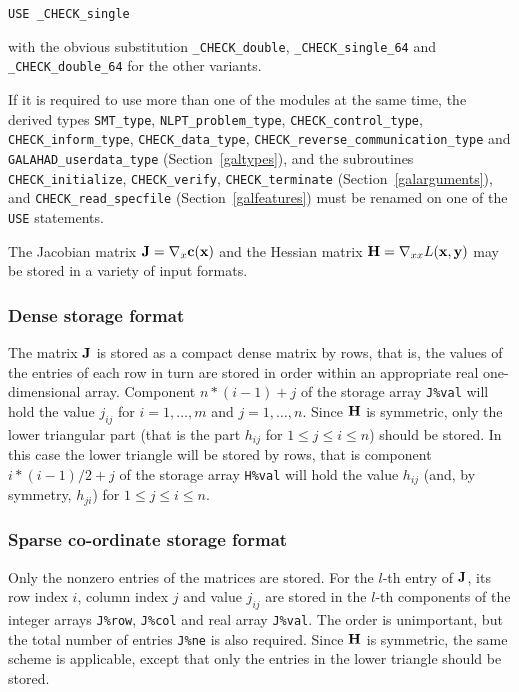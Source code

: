 \documentclass{galahad}
\newcommand{\packagename}{CHECK}
\newcommand{\fullpackagename}{\libraryname\_\packagename}
\begin{document}
\hspace{8mm} {\tt USE \fullpackagename\_single}

\medskip
\noindent
with the obvious substitution {\tt \fullpackagename\_double},
{\tt \fullpackagename\_single\_64} and 
{\tt \fullpackagename\_double\_64} for the other variants.

\noindent
If it is required to use more than one of the modules at the same time, 
the derived types
{\tt SMT\_type}, 
{\tt NLPT\_problem\_type}, 
{\tt \packagename\_\-control\_type}, 
{\tt \packagename\_inform\_type},
{\tt \packagename\_data\_type},
{\tt \packagename\_reverse\_communication\_type} and
{\tt GALAHAD\_userdata\_\-type}
(Section~\ref{galtypes}),
and the subroutines
{\tt \packagename\_initialize}, 
{\tt \packagename\_verify},
{\tt \packagename\_terminate}
(Section~\ref{galarguments}),
and 
{\tt \packagename\_read\_specfile}
(Section~\ref{galfeatures})
must be renamed on one of the {\tt USE} statements.


\galmatrix
The Jacobian matrix ${\mathbf{J}} = \nabla_x{\mathbf{c}}({\mathbf{x}})$ and the Hessian matrix ${\mathbf{H}} = \nabla_{xx} L({\mathbf{x}},{\mathbf{y}})$
may be stored in a variety of input formats.

\subsubsection{Dense storage format}\label{dense}
The matrix ${\mathbf{J}}$ is stored as a compact 
dense matrix by rows, that is, the values of the entries of each row in turn are
stored in order within an appropriate real one-dimensional array.
Component $n \ast (i-1) + j$ of the storage array {\tt J\%val} will hold the 
value $j_{ij}$ for $i = 1, \ldots , m$ and $j = 1, \ldots , n$.
Since ${\mathbf{H}}$ is symmetric, only the lower triangular part (that is the part 
$h_{ij}$ for $1 \leq j \leq i \leq n$) should be stored.  In this case
the lower triangle will be stored by rows, that is 
component $i \ast (i-1)/2 + j$ of the storage array {\tt H\%val}  
will hold the value $h_{ij}$ (and, by symmetry, $h_{ji}$)
for $1 \leq j \leq i \leq n$.

\subsubsection{Sparse co-ordinate storage format}\label{coordinate}
Only the nonzero entries of the matrices are stored. For the $l$-th
entry of ${\mathbf{J}}$, its row index $i$, column index $j$ and value
$j_{ij}$ are stored in the $l$-th components of the integer arrays
{\tt J\%row}, {\tt J\%col} and real array {\tt J\%val}.  The order is
unimportant, but the total number of entries {\tt J\%ne} is also
required.  Since ${\mathbf{H}}$ is symmetric, the same scheme is applicable,
except that only the entries in the lower triangle should be stored.
\end{document}
